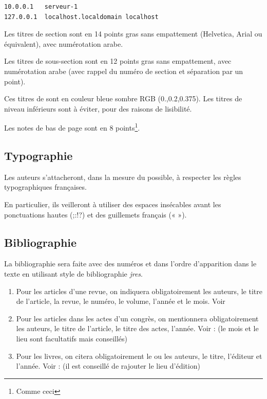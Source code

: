 \documentclass{jres}
\begin{document}
\begin{lstlisting}
10.0.0.1   serveur-1
127.0.0.1  localhost.localdomain localhost
\end{lstlisting}

Les titres de section sont en 14 points gras sans empattement
(Helvetica, Arial ou équivalent), avec numérotation arabe.

Les titres de sous-section sont en 12 points gras sans empattement,
avec numérotation arabe (avec rappel du numéro de section et
séparation par un point).

Ces titres de sont en couleur bleue sombre RGB (0.,0.2,0.375).  Les
titres de niveau inférieurs sont à éviter, pour des raisons de
lisibilité.

Les notes de bas de page sont en 8 points\footnote{Comme ceci}.

\subsection{Typographie}

Les auteurs s'attacheront, dans la mesure du possible, à respecter les
règles typographiques françaises.

En particulier, ils veilleront à utiliser des espaces insécables avant
les ponctuations hautes (;:!?) et des guillemets français (« »).

\subsection{Bibliographie}

La bibliographie sera faite avec des numéros et dans l'ordre
d'apparition dans le texte en utilisant style de bibliographie
\emph{jres}.

\begin{enumerate}

\item Pour les articles d'une revue, on indiquera obligatoirement les
  auteurs, le titre de l'article, la revue, le numéro, le volume,
  l'année et le mois. Voir \cite{exemple1}

\item Pour les articles dans les actes d'un congrès, on mentionnera
  obligatoirement les auteurs, le titre de l'article, le titre des
  actes, l'année. Voir : \cite{exemple2} (le mois et le lieu sont
  facultatifs mais conseillés)

\item Pour les livres, on citera obligatoirement le ou les auteurs, le
  titre, l'éditeur et l'année. Voir : \cite{exemple3} (il est conseillé de
  rajouter le lieu d'édition)

\end{enumerate}
\end{document}
